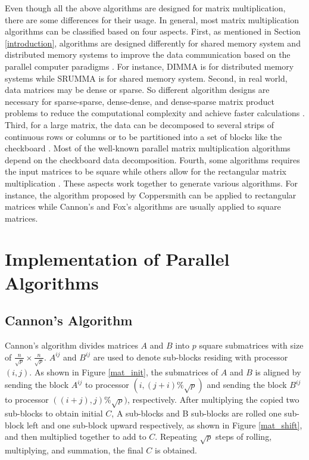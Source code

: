 \documentclass[conference]{IEEEtran}
\begin{document}
Even though all the above algorithms are designed for matrix multiplication, there are some differences for their usage. In general, most matrix multiplication algorithms can be classified based on four aspects. First, as mentioned in Section \ref{introduction}, algorithms are designed differently for shared memory system and distributed memory systems to improve the data communication based on the parallel computer paradigms \cite{b2}. For instance, DIMMA is for distributed memory systems while SRUMMA is for shared memory system. Second, in real world, data matrices may be dense or sparse. So different algorithm designs are necessary for sparse-sparse, dense-dense, and dense-sparse matrix product problems to reduce the computational complexity and achieve faster calculations \cite{b19,b20}.  Third, for a large matrix, the data can be decomposed to several strips of continuous rows or columns or to be partitioned into a set of blocks like the checkboard \cite{b21}. Most of the well-known parallel matrix multiplication algorithms depend on the checkboard data decomposition. Fourth, some algorithms requires the input matrices to be square while others allow for the rectangular matrix multiplication \cite{b22}. These aspects work together to generate various algorithms. For instance, the algorithm proposed by Coppersmith \cite{b22} can be applied to rectangular matrices while Cannon’s and Fox’s algorithms are usually applied to square matrices. 



\section{Implementation of Parallel Algorithms}\label{implementation}

\subsection{Cannon's Algorithm}
Cannon's algorithm divides matrices $A$ and $B$ into $p$ square submatrices with size of $\frac{n}{\sqrt{p} } \times \frac{n}{\sqrt{p}}$. $A^{ij}$ and $B^{ij}$ are used to denote sub-blocks residing with processor $(i,j)$. As shown in Figure \ref{mat_init}, the submatrices of $A$ and $B$ is aligned by sending the block $A^{ij}$ to processor $(i,(j+i)\%\sqrt{p})$ and sending the block $B^{ij}$ to processor $((i+j), j)\%\sqrt{p})$, respectively. After multiplying the copied two sub-blocks to obtain initial $C$, A sub-blocks and B sub-blocks are rolled one sub-block left and one sub-block upward respectively, as shown in Figure \ref{mat_shift}, and then multiplied together to add to $C$. Repeating $\sqrt{p}$ steps of rolling, multiplying, and summation, the final $C$ is obtained.
\end{document}
